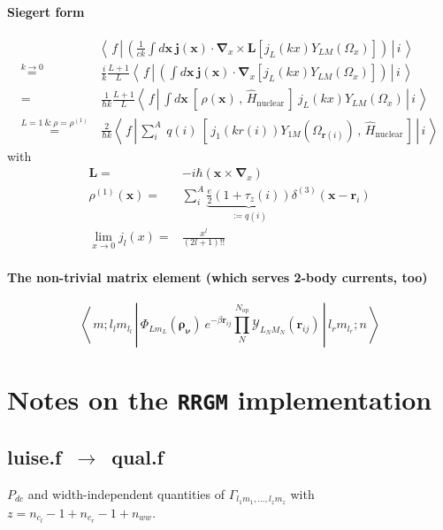 \documentclass[onecolumn,preprint,superscriptaddress,nofootinbib,notitlepage,10pt,linenumbers]{revtex4-1}
\newcommand{\be}{\begin{equation}}
\newcommand{\ee}{\end{equation}}
\newcommand{\la}{\label}
\newcommand{\ve}[1]{\ensuremath{\boldsymbol{#1}}}
\newcommand{\me}[3] {\left\langle\,#1\,\left|\left.\,#2\,\right|\,#3\,\right.\right\rangle}
\begin{document}
\paragraph{Siegert form}
\begin{align}\la{eq.siegert}
&\me{f}{\left(\frac{1}{ck}\int d\ve{x}~\ve{j}(\ve{x})\cdot\ve{\nabla}_x\times\ve{L}\left[j_L(kx)Y_{LM}(\Omega_x)\right]\right)}{i}
\\[1em]
\overset{\scriptstyle k\to 0}{=}&~\frac{i}{k}\frac{L+1}{L}\me{f}{\left(\int d\ve{x}~\ve{j}(\ve{x})\cdot\ve{\nabla}_x\left[j_L(kx)Y_{LM}(\Omega_x)\right]\right)}{i}
\\[1em]
=&~\frac{1}{\hbar k}\frac{L+1}{L}\me{f}{\int d\ve{x}~\left[\,\rho(\ve{x})\,,\,\hat{H}_\text{nuclear}\,\right]~j_L(kx)Y_{LM}(\Omega_x)}{i}\\[1em]
\overset{\scriptstyle L=1~\&~\rho=\rho^{(1)}}{=}&~\frac{2}{\hbar k}\me{f}{\sum\limits_i^A~q(i)~\left[\,j_1(kr(i))Y_{1M}(\Omega_{\ve{r}(i)})\,,\,\hat{H}_\text{nuclear}\,\right]}{i}
\end{align}
with
\begin{align}\la{eq.siegert.descr}
\ve{L}=&-i\hbar\left(\ve{x}\times\ve{\nabla}_x\right)\\
\rho^{(1)}(\ve{x})=&\sum\limits_i^A\underbrace{\frac{e}{2}(1+\tau_z(i))}_{:=q(i)}\delta^{(3)}(\ve{x}-\ve{r}_i)\\
\lim\limits_{x\to 0}j_l(x)=&\frac{x^l}{(2l+1)!!}
\end{align}

\paragraph{The non-trivial matrix element (which serves {\bf 2-body} currents, too)}
\be\la{eq.theme}
\me{m;l_lm_{l_l}}{\Phi_{Lm_L}(\ve{\rho_\nu})~e^{-\beta\ve{r}_{ij}}\prod\limits_{N}^{N_{\text{op}}}\mathcal{Y}_{L_NM_N}(\ve{r}_{ij})}{l_rm_{l_r};n}
\ee


\section{Notes on the \texttt{RRGM} implementation}



\subsection*{luise.f~$\to$~qual.f}
$P_{dc}$ and width-independent quantities of $\Gamma_{l_1m_1,\ldots,l_zm_z}$ with $z=n_{c_l}-1+n_{c_r}-1+n_{ww}$.
\end{document}
